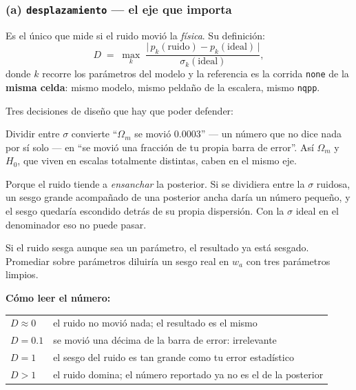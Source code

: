 \documentclass[11pt,a4paper]{article}
\begin{document}
\subsubsection*{(a) \texttt{desplazamiento} --- el eje que importa}

Es el único que mide si el ruido movió la \emph{física}. Su definición:
\begin{equation}
  \label{eq:desp}
  D \;=\; \max_{k}\;
  \frac{\big|\,p_k(\text{ruido}) - p_k(\text{ideal})\,\big|}
       {\sigma_k(\text{ideal})},
\end{equation}
donde $k$ recorre los parámetros del modelo y la referencia es la corrida
\texttt{none} de la \textbf{misma celda}: mismo modelo, mismo peldaño de la
escalera, mismo \texttt{nqpp}.

\medskip
\noindent
Tres decisiones de diseño que hay que poder defender:

\begin{description}[leftmargin=1.6em,style=nextline]
  \item[Por qué es adimensional.] Dividir entre $\sigma$ convierte
    ``$\Omega_m$ se movió $0.0003$'' --- un número que no dice nada por sí
    solo --- en ``se movió una fracción de tu propia barra de error''.
    Así $\Omega_m$ y $H_0$, que viven en escalas totalmente distintas, caben
    en el mismo eje.
  \item[Por qué el divisor es $\sigma$ de la corrida \emph{ideal}.] Porque el
    ruido tiende a \emph{ensanchar} la posterior. Si se dividiera entre la
    $\sigma$ ruidosa, un sesgo grande acompañado de una posterior ancha daría
    un número pequeño, y el sesgo quedaría escondido detrás de su propia
    dispersión. Con la $\sigma$ ideal en el denominador eso no puede pasar.
  \item[Por qué el máximo y no el promedio.] Si el ruido sesga aunque sea un
    parámetro, el resultado ya está sesgado. Promediar sobre parámetros
    diluiría un sesgo real en $w_a$ con tres parámetros limpios.
\end{description}

\medskip
\noindent
\textbf{Cómo leer el número:}

\begin{center}
\small
\begin{tabular}{ll}
\toprule
$D \approx 0$   & el ruido no movió nada; el resultado es el mismo \\
$D = 0.1$       & se movió una décima de la barra de error: irrelevante \\
$D = 1$         & el sesgo del ruido es tan grande como tu error estadístico \\
$D > 1$         & el ruido domina; el número reportado ya no es el de la posterior \\
\bottomrule
\end{tabular}
\end{center}
\end{document}
